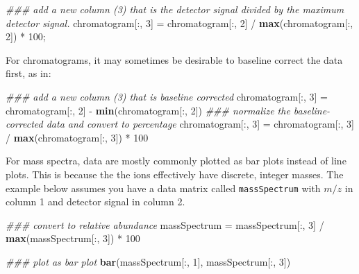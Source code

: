 \documentclass[]{tufte-book}
\newenvironment{Shaded}{}{}
\newcommand{\CommentTok}[1]{\textcolor[rgb]{0.38,0.63,0.69}{\textit{#1}}}
\newcommand{\DecValTok}[1]{\textcolor[rgb]{0.25,0.63,0.44}{#1}}
\newcommand{\KeywordTok}[1]{\textcolor[rgb]{0.00,0.44,0.13}{\textbf{#1}}}
\newcommand{\NormalTok}[1]{#1}
\newcommand{\OperatorTok}[1]{\textcolor[rgb]{0.40,0.40,0.40}{#1}}
\newcommand{\StringTok}[1]{\textcolor[rgb]{0.25,0.44,0.63}{#1}}
\begin{document}
\begin{Shaded}
\begin{Highlighting}[]
\CommentTok{### add a new column (3) that is the detector signal divided by the maximum detector signal.}
\NormalTok{chromatogram[}\OperatorTok{:}\NormalTok{, }\DecValTok{3}\NormalTok{] =}\StringTok{ }\NormalTok{chromatogram[}\OperatorTok{:}\NormalTok{, }\DecValTok{2}\NormalTok{] }\OperatorTok{/}\StringTok{ }\KeywordTok{max}\NormalTok{(chromatogram[}\OperatorTok{:}\NormalTok{, }\DecValTok{2}\NormalTok{]) }\OperatorTok{*}\StringTok{ }\DecValTok{100}\NormalTok{;}
\end{Highlighting}
\end{Shaded}

For chromatograms, it may sometimes be desirable to baseline correct the data first, as in:

\begin{Shaded}
\begin{Highlighting}[]
\CommentTok{### add a new column (3) that is baseline corrected}
\NormalTok{chromatogram[}\OperatorTok{:}\NormalTok{, }\DecValTok{3}\NormalTok{] =}\StringTok{ }\NormalTok{chromatogram[}\OperatorTok{:}\NormalTok{, }\DecValTok{2}\NormalTok{] }\OperatorTok{-}\StringTok{ }\KeywordTok{min}\NormalTok{(chromatogram[}\OperatorTok{:}\NormalTok{, }\DecValTok{2}\NormalTok{])}
\CommentTok{### normalize the baseline-corrected data and convert to percentage}
\NormalTok{chromatogram[}\OperatorTok{:}\NormalTok{, }\DecValTok{3}\NormalTok{] =}\StringTok{ }\NormalTok{chromatogram[}\OperatorTok{:}\NormalTok{, }\DecValTok{3}\NormalTok{] }\OperatorTok{/}\StringTok{ }\KeywordTok{max}\NormalTok{(chromatogram[}\OperatorTok{:}\NormalTok{, }\DecValTok{3}\NormalTok{]) }\OperatorTok{*}\StringTok{ }\DecValTok{100}
\end{Highlighting}
\end{Shaded}

For mass spectra, data are mostly commonly plotted as bar plots instead of line plots. This is because the the ions effectively have discrete, integer masses. The example below assumes you have a data matrix called \texttt{massSpectrum} with \(m/z\) in column 1 and detector signal in column 2.

\begin{Shaded}
\begin{Highlighting}[]
\CommentTok{### convert to relative abundance}
\NormalTok{massSpectrum =}\StringTok{ }\NormalTok{massSpectrum[}\OperatorTok{:}\NormalTok{, }\DecValTok{3}\NormalTok{] }\OperatorTok{/}\StringTok{ }\KeywordTok{max}\NormalTok{(massSpectrum[}\OperatorTok{:}\NormalTok{, }\DecValTok{3}\NormalTok{]) }\OperatorTok{*}\StringTok{ }\DecValTok{100}

\CommentTok{### plot as bar plot}
\KeywordTok{bar}\NormalTok{(massSpectrum[}\OperatorTok{:}\NormalTok{, }\DecValTok{1}\NormalTok{], massSpectrum[}\OperatorTok{:}\NormalTok{, }\DecValTok{3}\NormalTok{])}
\end{Highlighting}
\end{Shaded}
\end{document}
